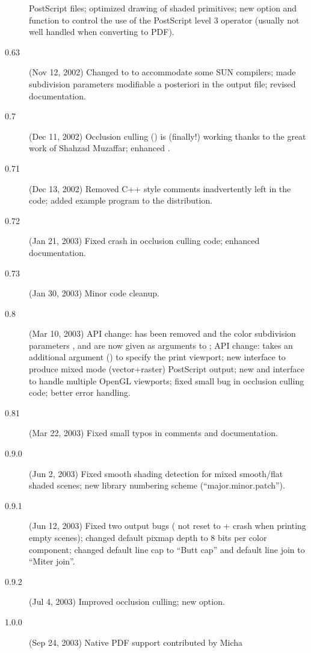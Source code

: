 \begin{description}
  PostScript files; optimized drawing of shaded primitives; new
   option and  function to
  control the use of the PostScript level 3  operator (usually
  not well handled when converting to PDF).
\item[0.63] (Nov 12, 2002) Changed  to  to accommodate
  some SUN compilers; made subdivision parameters modifiable a posteriori in
  the output file; revised documentation.
\item[0.7] (Dec 11, 2002) Occlusion culling () is
  (finally!) working thanks to the great work of Shahzad Muzaffar; enhanced
  .
\item[0.71] (Dec 13, 2002) Removed C++ style comments inadvertently left in
  the code; added example program  to the distribution.
\item[0.72] (Jan 21, 2003) Fixed crash in occlusion culling code; enhanced
  documentation.
\item[0.73] (Jan 30, 2003) Minor code cleanup.
\item[0.8] (Mar 10, 2003) API change:  has been
  removed and the color subdivision parameters ,  and 
  are now given as arguments to ; API change:
   takes an additional argument () to
  specify the print viewport; new  interface to produce
  mixed mode (vector+raster) PostScript output; new 
  and  interface to handle multiple OpenGL viewports;
  fixed small bug in occlusion culling code; better error handling.
\item[0.81] (Mar 22, 2003) Fixed small typos in comments and documentation.
\item[0.9.0] (Jun 2, 2003) Fixed smooth shading detection for mixed
  smooth/flat shaded scenes; new library numbering scheme
  (``major.minor.patch'').
\item[0.9.1] (Jun 12, 2003) Fixed two  output bugs
  ( not reset to  + crash when printing empty
  scenes); changed default pixmap depth to 8 bits per color component;
  changed default line cap to ``Butt cap'' and default line join to ``Miter
  join''.
\item[0.9.2] (Jul 4, 2003) Improved occlusion culling; new
   option.
\item[1.0.0] (Sep 24, 2003) Native PDF support contributed by Micha

\end{description}
